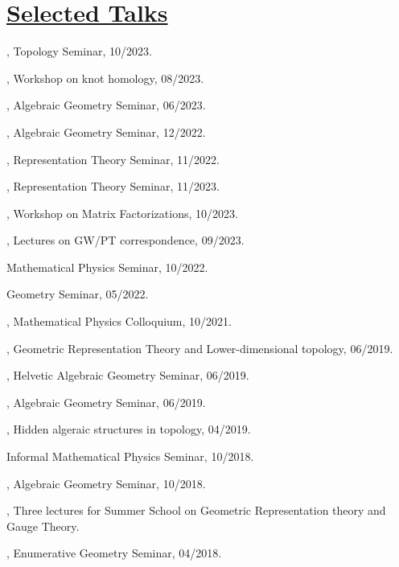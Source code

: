 \documentclass[11pt]{amsart}
\theoremstyle{plain}
\theoremstyle{definition}
\theoremstyle{remark}
\begin{document}
\section*{\Large\underline{ Selected Talks}}



\medskip

, Topology Seminar, 10/2023.

, Workshop on knot homology, 08/2023.

, Algebraic Geometry Seminar, 06/2023.

, Algebraic Geometry Seminar, 12/2022.

, Representation Theory Seminar, 11/2022.

, Representation  Theory Seminar, 11/2023.

, Workshop on Matrix Factorizations, 10/2023.

, Lectures on GW/PT correspondence, 09/2023.

 Mathematical Physics Seminar, 10/2022.

 Geometry Seminar, 05/2022.

, Mathematical Physics Colloquium, 10/2021.

, Geometric Representation Theory and Lower-dimensional topology, 06/2019.

,  Helvetic Algebraic Geometry Seminar, 06/2019.

, Algebraic Geometry Seminar, 06/2019.

, Hidden algeraic structures in topology, 04/2019.

 Informal Mathematical Physics Seminar, 10/2018.

, Algebraic Geometry Seminar, 10/2018.

, Three lectures for Summer School on Geometric Representation theory and
Gauge Theory.

, Enumerative Geometry Seminar, 04/2018.
\end{document}
